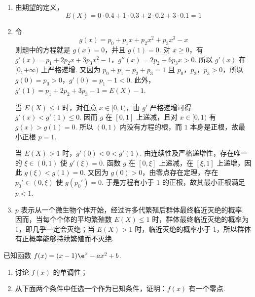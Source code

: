 \begin{solution}
\begin{enumerate}
\item 由期望的定义，
\[
E(X)=0\cdot0.4+1\cdot0.3+2\cdot0.2+3\cdot0.1=1
\]

\item 令
\[
g(x)=p_0+p_1x+p_2x^2+p_3x^3-x
\]
则题中的方程就是 \(g(x)=0\)，并且 \(g(1)=0\). 对 \(x\ge0\)，有 \(g'(x)=p_1+2p_2x+3p_3x^2-1\)，\(g''(x)=2p_2+6p_3x>0\).
所以 \(g'(x)\) 在 \([0,+\infty)\) 上严格递增. 又因为 \(p_0+p_1+p_2+p_3=1\) 且 \(p_0\)，\(p_2\)，\(p_3>0\)，所以 \(g(0)=p_0>0\)，\(g'(0)=p_1-1<0\). 此外，\(g'(1)=p_1+2p_2+3p_3-1=E(X)-1\).

当 \(E(X)\le1\) 时，对任意 \(x\in[0,1)\)，由 \(g'\) 严格递增可得 \(g'(x)<g'(1)\le0\). 因而 \(g\) 在 \([0,1]\) 上递减，且对 \(x\in[0,1)\) 有 \(g(x)>g(1)=0\). 所以 \((0,1)\) 内没有方程的根，而 \(1\) 本身是正根，故最小正根 \(p=1\).

当 \(E(X)>1\) 时，\(g'(0)<0<g'(1)\). 由连续性及严格递增性，存在唯一的 \(\xi\in(0,1)\) 使 \(g'(\xi)=0\). 函数 \(g\) 在 \([0,\xi]\) 上递减，在 \([\xi,1]\) 上递增，因此 \(g(\xi)<g(1)=0\). 又因为 \(g(0)>0\)，由零点存在定理，存在 \(p_0'\in(0,\xi)\) 使 \(g(p_0')=0\). 于是方程有小于 \(1\) 的正根，故其最小正根满足 \(p<1\).

\item \(p\) 表示从一个微生物个体开始，经过许多代繁殖后群体最终临近灭绝的概率. 因而，当每个个体的平均繁殖数 \(E(X)\le1\) 时，群体最终临近灭绝的概率为 \(1\)，即几乎一定会灭绝；当 \(E(X)>1\) 时，临近灭绝的概率小于 \(1\)，所以群体有正概率能够持续繁殖而不灭绝.
\end{enumerate}
\end{solution}

\begin{problem}
已知函数 \(f(x)=(x-1)\e^x-ax^2+b\).

\begin{enumerate}
\item 讨论 \(f(x)\) 的单调性；
\item 从下面两个条件中任选一个作为已知条件，证明：\(f(x)\) 有一个零点.
\end{enumerate}
\end{problem}


